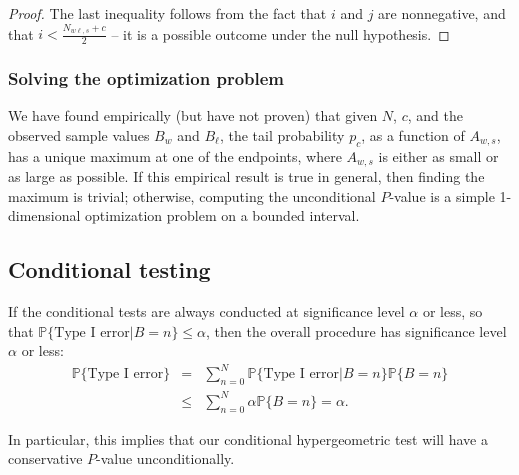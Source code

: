 \begin{proof}
The last inequality follows from the fact that $i$ and $j$ are nonnegative, and 
that $i < \frac{N_{w\ell,s}+c}{2}$ -- it is a possible outcome under the null hypothesis.


\end{proof}

\subsubsection{Solving the optimization problem}

We have found empirically (but have not proven) that given $N$, $c$, and the observed sample values $B_w$ and $B_\ell$, the tail probability $p_c$, as a function of $A_{w,s}$,
has a unique maximum at one of the endpoints, where $A_{w,s}$ is either as small or as large as possible.
If this empirical result is true in general, then finding the maximum is trivial;
otherwise, computing the unconditional $P$-value is a simple 1-dimensional optimization problem
on a bounded interval.

\subsection{Conditional testing}
If the conditional tests are always conducted at significance level $\alpha$ or less, so that
$\mathbb{P} \{\mbox{Type I error} | B = n\} \le \alpha$, then the
overall procedure has significance level $\alpha$ or less:
\begin{eqnarray}
    \mathbb{P} \{\mbox{Type I error}\} &=& \sum_{n=0}^N  \mathbb{P}\{\mbox{Type I error} |  B = n\} \mathbb{P} \{ B = n \} \nonumber \\
       & \le & \sum_{n=0}^N \alpha \mathbb{P} \{  B = n \}  =  \alpha.
\end{eqnarray}

In particular, this implies that our conditional hypergeometric test will have a conservative $P$-value  unconditionally.
